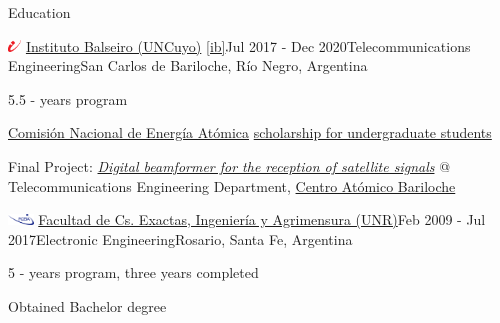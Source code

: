 \documentclass{resume} %
\begin{document}
\clearpage


\begin{rSection}{Education}

    \begin{rSubsection}{\includegraphics[height=0.3cm]{images/ib-logo.png} \href{https://www.ib.edu.ar/}{Instituto Balseiro (UNCuyo)} \ref{ib}}{Jul 2017 - Dec 2020}{Telecommunications Engineering}{San Carlos de Bariloche, Río Negro, Argentina}

        \item 5.5 - years program
        \item \href{https://www.argentina.gob.ar/cnea}{Comisión Nacional de Energía Atómica} \href{https://www.ib.edu.ar/ingreso-a-carreras/becas.html}{scholarship for undergraduate students}
        \item Final Project: \href{https://github.com/grigosback/digital-beamforming}{\textit{Digital beamformer for the reception of satellite signals}} @ Telecommunications Engineering Department, \href{https://www.argentina.gob.ar/cnea/centros-atomicos/cab}{Centro Atómico Bariloche}

    \end{rSubsection}

    \begin{rSubsection}{\includegraphics[height=0.3cm]{images/fceia.png} \href{https://web.fceia.unr.edu.ar/}{Facultad de Cs. Exactas, Ingeniería y Agrimensura (UNR)}}{Feb 2009 - Jul 2017}{Electronic Engineering}{Rosario, Santa Fe, Argentina}

        \item 5 - years program, three years completed
        \item Obtained Bachelor degree

    \end{rSubsection}
\end{rSection}



\end{document}
